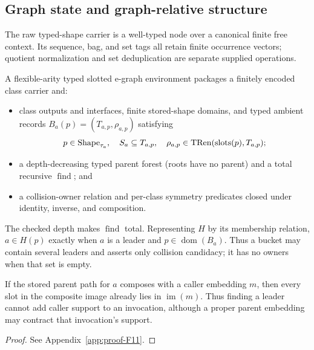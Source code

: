\subsection{Graph state and graph-relative structure}

The raw typed-shape carrier is a well-typed node over a canonical finite free
context.  Its sequence, bag, and set tags all retain finite occurrence vectors;
quotient normalization and set deduplication are separate supplied operations.

\begin{definition}
\label{res:F10}
A flexible-arity typed slotted e-graph environment packages a finitely encoded class carrier and:
\begin{itemize}
\item class outputs and interfaces, finite stored-shape domains, and typed
ambient records $B_a(p)=(T_{a,p},\rho_{a,p})$ satisfying
\[
p\in\operatorname{Shape}_{\tau_a},\quad S_a\subseteq T_{a,p},\quad
\rho_{a,p}\in\operatorname{TRen}(\operatorname{slots}(p),T_{a,p});
\]
\item a depth-decreasing typed parent forest (roots have no parent) and a
total recursive $\operatorname{find}$; and
\item a collision-owner relation and per-class symmetry predicates closed
under identity, inverse, and composition.
\end{itemize}
The checked depth makes $\operatorname{find}$ total.  Representing $H$ by its
membership relation, $a\in H(p)$ exactly when $a$ is a leader and
$p\in\operatorname{dom}(B_a)$.  Thus a bucket may contain several leaders and
asserts only collision candidacy; it has no owners when that set is empty.
\end{definition}

\begin{lemma}
\label{lem:find-support-contracts}
If the stored parent path for $a$ composes with a caller embedding $m$, then
every slot in the composite image already lies in $\operatorname{im}(m)$.
Thus finding a leader cannot add caller support to an invocation, although a
proper parent embedding may contract that invocation's support.
\end{lemma}
\begin{proof}See Appendix~\ref{app:proof-F11}.\end{proof}

